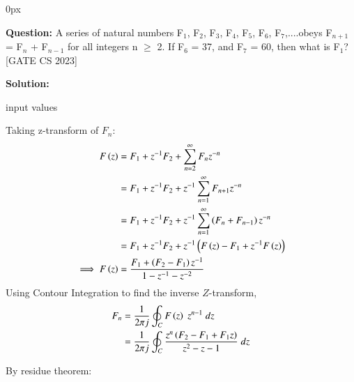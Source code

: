 \documentclass[journal,12pt]{IEEEtran}
\begin{document}
	\parindent 0px
	


	
	\title{}
	\author{EE23BTECH11209 - K S Ballvardhan$^{*}$
	}
	\maketitle
	\newpage
	\bigskip
	
	
	
	
	
	\textbf{Question:} A series of natural numbers F$_1$, F$_2$, F$_3$, F$_4$, F$_5$, F$_6$, F$_7$,....obeys F$_{n+1}$ = F$_n$ + F$_{n-1}$ for all integers n $\geq$ 2.
	If F$_6$ = 37, and F$_7$ = 60, then what is F$_1$? \hfill[GATE CS 2023]
	
	\textbf{Solution: }
	
	\begin{table}[ht] 
		\centering
		
		\caption{input values}
		\label{tab: Table2022cs36}
	\end{table}
	
    Taking z-transform of $ F_n$:
	\begin{align}
		F\left(z\right) &= F_1 + z^{-1} F_2 + \sum_{n=2}^{\infty} F_n z^{-n}\\
	    &= F_1 + z^{-1} F_2 + z^{-1} \sum_{n=1}^{\infty} F_{n+1} z^{-n}\\
	    &= F_1 + z^{-1} F_2 + z^{-1} \sum_{n=1}^{\infty} \left(F_n + F_{n-1}\right)z^{-n}\\
	    &= F_1 + z^{-1} F_2 + z^{-1}\left(F\left(z\right)-F_1 + z^{-1}F\left(z\right)\right)\\
		\implies F\left(z\right)&= \frac{F_1 + \left(F_2-F_1\right)z^{-1}}{1-z^{-1}-z^{-2}}
	\end{align}
	Using Contour Integration to find the inverse $Z$-transform,
	\begin{align}
		F_{n}&=\frac{1}{2\pi j}\oint_{C} F\left(z\right) \;z^{n-1} \;dz  \\
		&=\frac{1}{2\pi j}\oint_{C}\frac{z^{n}\left(F_2-F_1+F_1 z\right)}{z^2-z-1} \;dz 
	\end{align}
	
	By residue theorem:
	
\end{document}
